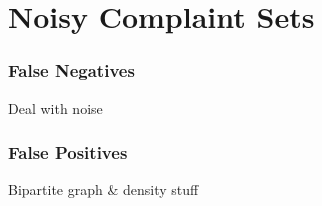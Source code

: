 \section{Noisy Complaint Sets}
\label{sec:noise}
\subsubsection{False Negatives}
Deal with noise

\subsubsection{False Positives}
Bipartite graph \& density stuff
